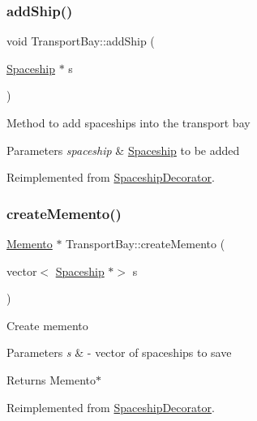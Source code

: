 \subsubsection{\texorpdfstring{add\+Ship()}{addShip()}}
{\footnotesize\ttfamily void Transport\+Bay\+::add\+Ship (\begin{DoxyParamCaption}\item[{\hyperlink{classSpaceship}{Spaceship} $\ast$}]{s }\end{DoxyParamCaption})\hspace{0.3cm}{\ttfamily [virtual]}}

Method to add spaceships into the transport bay 
\begin{DoxyParams}{Parameters}
{\em spaceship} & \hyperlink{classSpaceship}{Spaceship} to be added \\
\hline
\end{DoxyParams}


Reimplemented from \hyperlink{classSpaceshipDecorator_a5ed39419f5fab65dd4af11bf5136f7a4}{Spaceship\+Decorator}.

\mbox{\label{classTransportBay_aff9390fd8b7434bfa03b408028caf920}} 
\subsubsection{\texorpdfstring{create\+Memento()}{createMemento()}}
{\footnotesize\ttfamily \hyperlink{classMemento}{Memento} $\ast$ Transport\+Bay\+::create\+Memento (\begin{DoxyParamCaption}\item[{vector$<$ \hyperlink{classSpaceship}{Spaceship} $\ast$$>$}]{s }\end{DoxyParamCaption})\hspace{0.3cm}{\ttfamily [virtual]}}

Create memento 
\begin{DoxyParams}{Parameters}
{\em s} & -\/ vector of spaceships to save \\
\hline
\end{DoxyParams}
\begin{DoxyReturn}{Returns}
Memento$\ast$ 
\end{DoxyReturn}


Reimplemented from \hyperlink{classSpaceshipDecorator_a1acde91cd10517c94af41032aa5fdd9e}{Spaceship\+Decorator}.

